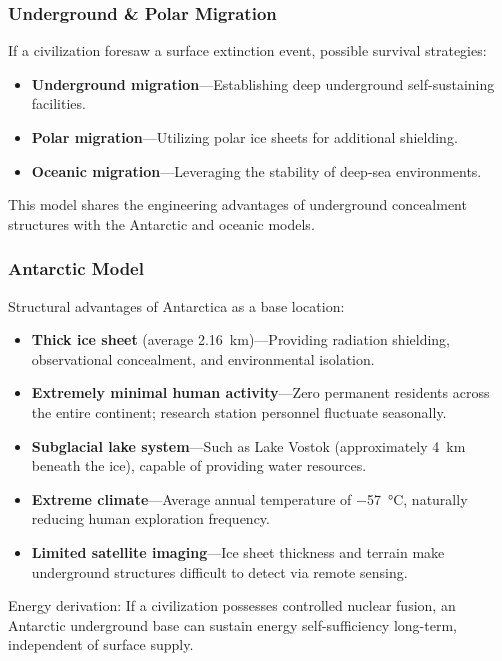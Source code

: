 \documentclass[aps,prd,twocolumn,superscriptaddress,nofootinbib]{revtex4-2}
\begin{document}
\subsubsection{Underground \& Polar Migration}\label{sec:underground-polar}

If a civilization foresaw a surface extinction event, possible survival strategies:

\begin{itemize}
  \item \textbf{Underground migration}---Establishing deep underground self-sustaining facilities.
  \item \textbf{Polar migration}---Utilizing polar ice sheets for additional shielding.
  \item \textbf{Oceanic migration}---Leveraging the stability of deep-sea environments.
\end{itemize}

This model shares the engineering advantages of underground concealment structures with the Antarctic and oceanic models.

\subsubsection{Antarctic Model}\label{sec:antarctic}

Structural advantages of Antarctica as a base location:

\begin{itemize}
  \item \textbf{Thick ice sheet} (average \SI{2.16}{km})---Providing radiation shielding, observational concealment, and environmental isolation.
  \item \textbf{Extremely minimal human activity}---Zero permanent residents across the entire continent; research station personnel fluctuate seasonally.
  \item \textbf{Subglacial lake system}---Such as Lake Vostok (approximately \SI{4}{km} beneath the ice), capable of providing water resources.
  \item \textbf{Extreme climate}---Average annual temperature of \SI{-57}{\degreeCelsius}, naturally reducing human exploration frequency.
  \item \textbf{Limited satellite imaging}---Ice sheet thickness and terrain make underground structures difficult to detect via remote sensing.
\end{itemize}

Energy derivation: If a civilization possesses controlled nuclear fusion, an Antarctic underground base can sustain energy self-sufficiency long-term, independent of surface supply.
\end{document}
